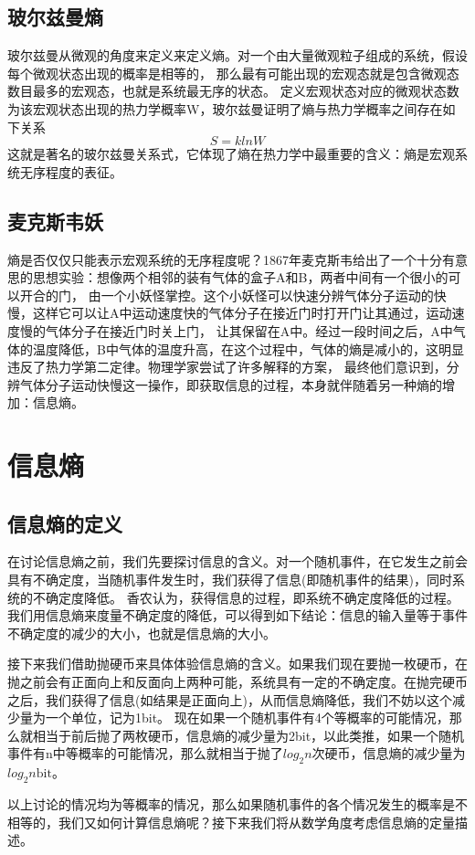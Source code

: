 \documentclass{ctexart}
\begin{document}
\subsection{玻尔兹曼熵}
玻尔兹曼从微观的角度来定义来定义熵。对一个由大量微观粒子组成的系统，假设每个微观状态出现的概率是相等的，
那么最有可能出现的宏观态就是包含微观态数目最多的宏观态，也就是系统最无序的状态。
定义宏观状态对应的微观状态数为该宏观状态出现的热力学概率W，玻尔兹曼证明了熵与热力学概率之间存在如下关系
\begin{equation}
    S=klnW
\end{equation}
这就是著名的玻尔兹曼关系式，它体现了熵在热力学中最重要的含义：熵是宏观系统无序程度的表征。
\subsection{麦克斯韦妖}
熵是否仅仅只能表示宏观系统的无序程度呢？1867年麦克斯韦给出了一个十分有意思的思想实验：想像两个相邻的装有气体的盒子A和B，两者中间有一个很小的可以开合的门，
由一个小妖怪掌控。这个小妖怪可以快速分辨气体分子运动的快慢，这样它可以让A中运动速度快的气体分子在接近门时打开门让其通过，运动速度慢的气体分子在接近门时关上门，
让其保留在A中。经过一段时间之后，A中气体的温度降低，B中气体的温度升高，在这个过程中，气体的熵是减小的，这明显违反了热力学第二定律。物理学家尝试了许多解释的方案，
最终他们意识到，分辨气体分子运动快慢这一操作，即获取信息的过程，本身就伴随着另一种熵的增加：信息熵。
\section{信息熵}
\subsection{信息熵的定义}
在讨论信息熵之前，我们先要探讨信息的含义。对一个随机事件，在它发生之前会具有不确定度，当随机事件发生时，我们获得了信息(即随机事件的结果)，同时系统的不确定度降低。
香农认为，获得信息的过程，即系统不确定度降低的过程。我们用信息熵来度量不确定度的降低，可以得到如下结论：信息的输入量等于事件不确定度的减少的大小，也就是信息熵的大小。
\par
接下来我们借助抛硬币来具体体验信息熵的含义。如果我们现在要抛一枚硬币，在抛之前会有正面向上和反面向上两种可能，系统具有一定的不确定度。在抛完硬币之后，我们获得了信息(如结果是正面向上)，从而信息熵降低，我们不妨以这个减少量为一个单位，记为1bit。
现在如果一个随机事件有4个等概率的可能情况，那么就相当于前后抛了两枚硬币，信息熵的减少量为2bit，以此类推，如果一个随机事件有n中等概率的可能情况，那么就相当于抛了$log_2n$次硬币，信息熵的减少量为$log_2n\mathrm{bit}$。
\par
以上讨论的情况均为等概率的情况，那么如果随机事件的各个情况发生的概率是不相等的，我们又如何计算信息熵呢？接下来我们将从数学角度考虑信息熵的定量描述。
\end{document}
